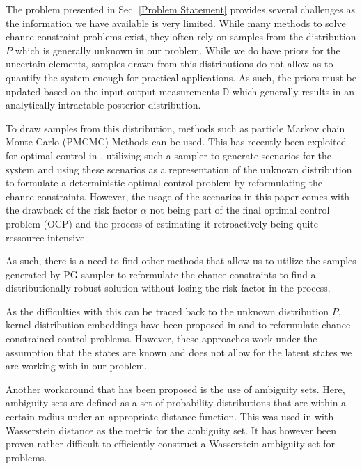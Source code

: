 
The problem presented in Sec. \ref{Problem Statement} provides several challenges as the information we have available is very limited. While many methods to solve chance constraint problems exist, they often rely on samples from the distribution $P$ which is generally unknown in our problem. While we do have priors for the uncertain elements, samples drawn from this distributions do not allow as to quantify the system enough for practical applications. As such, the priors must be updated based on the input-output measurements $\mathbb{D}$ which generally results in an analytically intractable posterior distribution.

To draw samples from this distribution, methods such as particle Markov chain Monte Carlo (PMCMC) Methods \cite{Andrieu_10} can be used. This has recently been exploited for optimal control in \cite{Robert_24} , utilizing such a sampler to generate scenarios for the system and using these scenarios as a representation of the unknown distribution to formulate a deterministic optimal control problem by reformulating the chance-constraints. However, the usage of the scenarios in this paper comes with the drawback of the risk factor $\alpha$ not being part of the final optimal control problem (OCP) and the process of estimating it retroactively being quite ressource intensive.

As such, there is a need to find other methods that allow us to utilize the samples generated by PG sampler to reformulate the chance-constraints to find a distributionally robust solution without losing the risk factor in the process. 

As the difficulties with this can be traced back to the unknown distribution $P$, kernel distribution embeddings have been proposed in \cite{Adam_21} and \cite{Adam_22} to reformulate chance constrained control problems. However, these approaches work under the assumption that the states are known and does not allow for the latent states we are working with in our problem.

Another workaround that has been proposed is the use of ambiguity sets. Here, ambiguity sets are defined as a set of probability distributions that are within a certain radius under an appropriate distance function. This was used in \cite{Hota_19} with Wasserstein distance as the metric for the ambiguity set. It has however been proven rather difficult to efficiently construct a Wasserstein ambiguity set for problems. 

